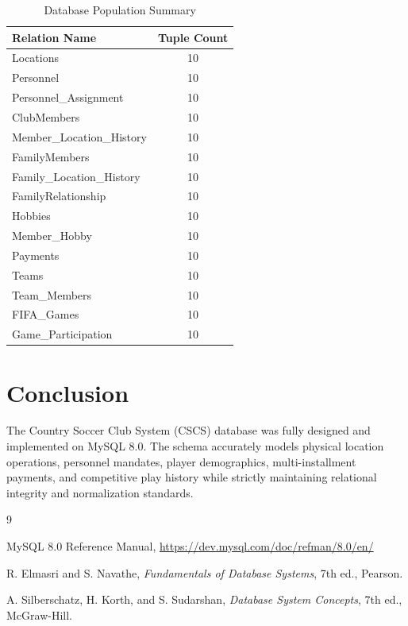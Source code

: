 \documentclass[11pt,a4paper]{article}
\begin{document}
\begin{table}[H]
\centering
\begin{tabular}{lc}
\toprule
Relation Name & Tuple Count \\
\midrule
Locations & 10 \\
Personnel & 10 \\
Personnel\_Assignment & 10 \\
ClubMembers & 10 \\
Member\_Location\_History & 10 \\
FamilyMembers & 10 \\
Family\_Location\_History & 10 \\
FamilyRelationship & 10 \\
Hobbies & 10 \\
Member\_Hobby & 10 \\
Payments & 10 \\
Teams & 10 \\
Team\_Members & 10 \\
FIFA\_Games & 10 \\
Game\_Participation & 10 \\
\bottomrule
\end{tabular}
\caption{Database Population Summary}
\end{table}





\section{Conclusion}


The Country Soccer Club System (CSCS) database was fully designed and implemented on MySQL 8.0. The schema accurately models physical location operations, personnel mandates, player demographics, multi-installment payments, and competitive play history while strictly maintaining relational integrity and normalization standards.





\begin{thebibliography}{9}

MySQL 8.0 Reference Manual,
\url{https://dev.mysql.com/doc/refman/8.0/en/}

R. Elmasri and S. Navathe,
\textit{Fundamentals of Database Systems}, 7th ed., Pearson.

A. Silberschatz, H. Korth, and S. Sudarshan,
\textit{Database System Concepts}, 7th ed., McGraw-Hill.

\end{thebibliography}
\end{document}
